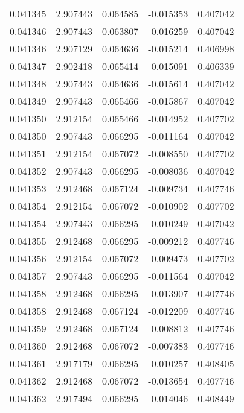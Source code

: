\begin{tabular}{lrrrr}
0.041345    &  2.907443 &  0.064585 & -0.015353 &             0.407042 \\
0.041346    &  2.907443 &  0.063807 & -0.016259 &             0.407042 \\
0.041346    &  2.907129 &  0.064636 & -0.015214 &             0.406998 \\
0.041347    &  2.902418 &  0.065414 & -0.015091 &             0.406339 \\
0.041348    &  2.907443 &  0.064636 & -0.015614 &             0.407042 \\
0.041349    &  2.907443 &  0.065466 & -0.015867 &             0.407042 \\
0.041350    &  2.912154 &  0.065466 & -0.014952 &             0.407702 \\
0.041350    &  2.907443 &  0.066295 & -0.011164 &             0.407042 \\
0.041351    &  2.912154 &  0.067072 & -0.008550 &             0.407702 \\
0.041352    &  2.907443 &  0.066295 & -0.008036 &             0.407042 \\
0.041353    &  2.912468 &  0.067124 & -0.009734 &             0.407746 \\
0.041354    &  2.912154 &  0.067072 & -0.010902 &             0.407702 \\
0.041354    &  2.907443 &  0.066295 & -0.010249 &             0.407042 \\
0.041355    &  2.912468 &  0.066295 & -0.009212 &             0.407746 \\
0.041356    &  2.912154 &  0.067072 & -0.009473 &             0.407702 \\
0.041357    &  2.907443 &  0.066295 & -0.011564 &             0.407042 \\
0.041358    &  2.912468 &  0.066295 & -0.013907 &             0.407746 \\
0.041358    &  2.912468 &  0.067124 & -0.012209 &             0.407746 \\
0.041359    &  2.912468 &  0.067124 & -0.008812 &             0.407746 \\
0.041360    &  2.912468 &  0.067072 & -0.007383 &             0.407746 \\
0.041361    &  2.917179 &  0.066295 & -0.010257 &             0.408405 \\
0.041362    &  2.912468 &  0.067072 & -0.013654 &             0.407746 \\
0.041362    &  2.917494 &  0.066295 & -0.014046 &             0.408449 \\

\end{tabular}
